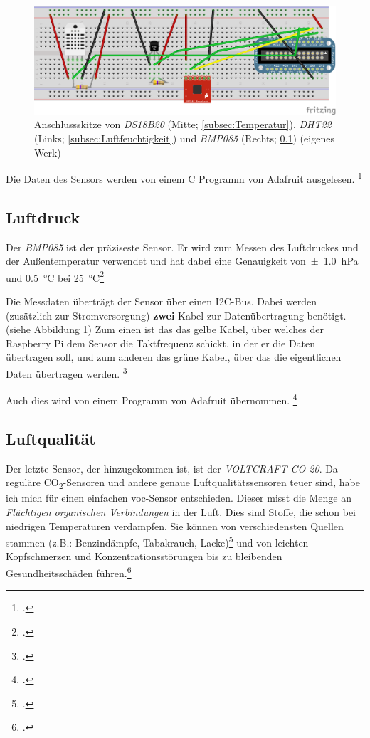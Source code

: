 \begin{figure}[h]
  \centering
     \includegraphics[width=\textwidth]{figures/steckbrett.png}
  \caption{Anschlussskitze von \textit{DS18B20} (Mitte; \ref{subsec:Temperatur}), \textit{DHT22} (Links; \ref{subsec:Luftfeuchtigkeit}) und \textit{BMP085} (Rechts; \ref{subsec:Luftdruck}) (eigenes Werk)}
  \label{fig:steckbrett}
\end{figure}

Die Daten des Sensors werden von einem \gls{C} Programm von Adafruit ausgelesen.
\footcite[Software Install]{DHT}

\subsection{Luftdruck}
\label{subsec:Luftdruck}

Der \textit{BMP085} ist der präziseste Sensor. Er wird zum Messen des Luftdruckes und der Außentemperatur verwendet und hat dabei eine Genauigkeit von\SI{\pm 1.0}{\hecto\pascal} und \SI{0.5}{\degreeCelsius} bei \SI{25}{\degreeCelsius}\footcite[6]{BMP085}

Die Messdaten überträgt der Sensor über einen \gls{I2C}-Bus. Dabei werden (zusätzlich zur Stromversorgung) \textbf{zwei} Kabel zur Datenübertragung benötigt. (siehe Abbildung \ref{fig:steckbrett})
Zum einen ist das das gelbe Kabel, über welches der Raspberry Pi dem Sensor die Taktfrequenz schickt, in der er die Daten übertragen soll, und zum anderen das grüne Kabel, über das die eigentlichen Daten übertragen werden.
\footcite[Hooking Everything Up]{bmp058_adafruit}

Auch dies wird von einem Programm von Adafruit übernommen. \footcite[Using the Adafruit BMP Python Library (Updated)]{bmp058_adafruit}

\subsection{Luftqualität}
\label{subsec:Luftqualitat}
Der letzte Sensor, der hinzugekommen ist, ist der \textit{VOLTCRAFT CO-20}. Da reguläre CO\textsubscript{2}-Sensoren und andere genaue Luftqualitätssensoren teuer sind, habe ich mich für einen einfachen \acrshort{voc}-Sensor entschieden. Dieser misst die Menge an \textit{Flüchtigen organischen Verbindungen} in der Luft. Dies sind Stoffe, die schon bei niedrigen Temperaturen verdampfen. Sie können von verschiedensten Quellen stammen (z.B.: Benzindämpfe, Tabakrauch, Lacke)\footcite[41\psqq]{innenraum} und von leichten Kopfschmerzen und Konzentrationsstörungen bis zu bleibenden Gesundheitsschäden führen.\footcite[Gesundheitliche Wirkung]{VOC}

